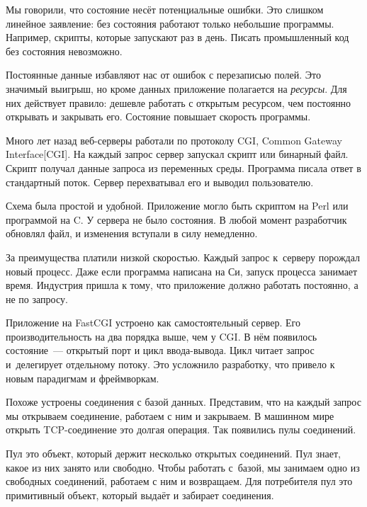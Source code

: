 Мы говорили, что состояние несёт потенциальные ошибки. Это слишком линейное
заявление: без состояния работают только небольшие программы. Например, скрипты,
которые запускают раз в день. Писать промышленный код без состояния невозможно.


Постоянные данные избавляют нас от ошибок с перезаписью полей. Это значимый
выигрыш, но кроме данных приложение полагается на \emph{ресурсы}. Для них
действует правило: дешевле работать с открытым ресурсом, чем постоянно открывать
и закрывать его. Состояние повышает скорость программы.


Много лет назад веб-серверы работали по протоколу CGI, Common Gateway
Interface[CGI]. На
каждый запрос сервер запускал скрипт или бинарный файл. Скрипт получал данные
запроса из переменных среды. Программа писала ответ в стандартный поток. Сервер
перехватывал его и выводил пользователю.

Схема была простой и удобной. Приложение могло быть скриптом на Perl или
программой на C\Plus\Plus. У сервера не было состояния. В любой момент
разработчик обновлял файл, и изменения вступали в силу немедленно.

За преимущества платили низкой скоростью. Каждый запрос к~серверу порождал новый
процесс. Даже если программа написана на Си, запуск процесса занимает
время. Индустрия пришла к тому, что приложение должно работать постоянно, а не
по запросу.


Приложение на FastCGI устроено как самостоятельный сервер. Его
производительность на два порядка выше, чем у CGI. В нём появилось
состояние~--- открытый порт и цикл ввода-вывода. Цикл читает запрос и~делегирует
отдельному потоку. Это усложнило разработку, что привело к новым парадигмам
и фреймворкам.

Похоже устроены соединения с базой данных. Представим, что на каждый запрос мы
открываем соединение, работаем с ним и закрываем. В машинном мире открыть
TCP-соединение это долгая операция. Так появились пулы соединений.


Пул это объект, который держит несколько открытых соединений. Пул знает, какое
из них занято или свободно. Чтобы работать с~базой, мы занимаем одно из
свободных соединений, работаем с ним и возвращаем. Для потребителя пул это
примитивный объект, который выдаёт и забирает соединения.

